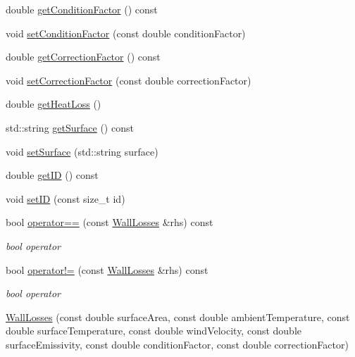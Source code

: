\begin{DoxyCompactItemize}
\item 
double \hyperlink{class_wall_losses_a16ab4003a17f9e95f28b9390b92c2b27}{get\+Condition\+Factor} () const
\item 
void \hyperlink{class_wall_losses_a1533a7513460d22f433fb670700573a2}{set\+Condition\+Factor} (const double condition\+Factor)
\item 
double \hyperlink{class_wall_losses_a4ce6a0ec36cd868b14b041f18251cb6d}{get\+Correction\+Factor} () const
\item 
void \hyperlink{class_wall_losses_affdf3f6c3d54d73c7f91e1515fb12533}{set\+Correction\+Factor} (const double correction\+Factor)
\item 
double \hyperlink{class_wall_losses_a884da3507498878f619cbe5ba340c0ef}{get\+Heat\+Loss} ()
\item 
std\+::string \hyperlink{class_wall_losses_a10f5de20dc6fead726adbf62a9c49b09}{get\+Surface} () const
\item 
void \hyperlink{class_wall_losses_af329a27b78e1f2d84af6a48ffc59bfad}{set\+Surface} (std\+::string surface)
\item 
double \hyperlink{class_wall_losses_ad67b46094ba89cb759ec124c63c137de}{get\+ID} () const
\item 
void \hyperlink{class_wall_losses_a91526efc0eb1bf030ebc1d864a21acdd}{set\+ID} (const size\+\_\+t id)
\item 
\mbox{\label{class_wall_losses_ad9eebb34927690332c00df51507878e9}} 
bool \hyperlink{class_wall_losses_ad9eebb34927690332c00df51507878e9}{operator==} (const \hyperlink{class_wall_losses}{Wall\+Losses} \&rhs) const
\begin{DoxyCompactList}\small\item\em bool operator \end{DoxyCompactList}\item 
\mbox{\label{class_wall_losses_a46d50205e67870978292c4bfa1c9d329}} 
bool \hyperlink{class_wall_losses_a46d50205e67870978292c4bfa1c9d329}{operator!=} (const \hyperlink{class_wall_losses}{Wall\+Losses} \&rhs) const
\begin{DoxyCompactList}\small\item\em bool operator \end{DoxyCompactList}\item 
\hyperlink{class_wall_losses_a7d46f259c632ecdcde5ae31468c03e2e}{Wall\+Losses} (const double surface\+Area, const double ambient\+Temperature, const double surface\+Temperature, const double wind\+Velocity, const double surface\+Emissivity, const double condition\+Factor, const double correction\+Factor)

\end{DoxyCompactItemize}
